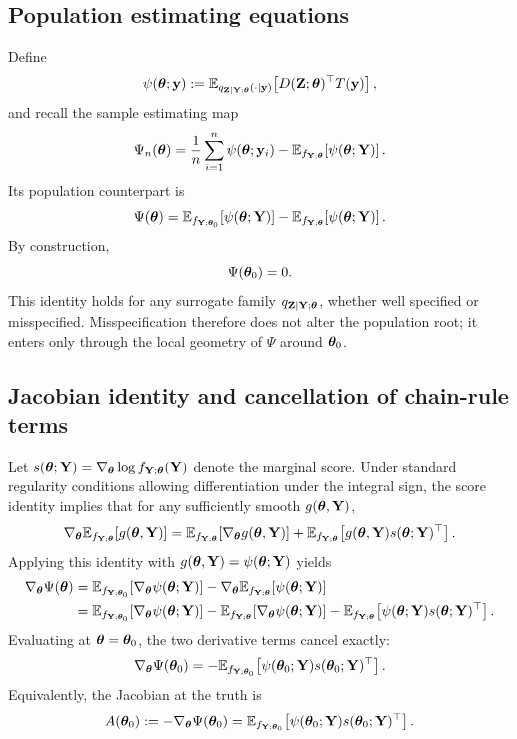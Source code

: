 \documentclass[twoside,11pt]{article}
\begin{document}
\subsection{Population estimating equations}

Define
\begin{equation}
\psi({\bm{\theta}};{\bf y})
:=
\mathbb E_{q_{{\bf Z}\mid{\bf Y};{\bm{\theta}}}(\cdot\mid {\bf y})}
\!\left[D({\bf Z};{\bm{\theta}})^\top T({\bf y})\right],
\label{eq:psi_theta_dep}
\end{equation}
and recall the sample estimating map
\[
\Psi_n({\bm{\theta}})
=
\frac{1}{n}\sum_{i=1}^n \psi({\bm{\theta}};{\bf y}_i)
-
\mathbb E_{f_{{\bf Y};{\bm{\theta}}}}\!\left[\psi({\bm{\theta}};{\bf Y})\right].
\]
Its population counterpart is
\[
\Psi({\bm{\theta}})
=
\mathbb E_{f_{{\bf Y};{\bm{\theta}}_0}}\!\left[\psi({\bm{\theta}};{\bf Y})\right]
-
\mathbb E_{f_{{\bf Y};{\bm{\theta}}}}\!\left[\psi({\bm{\theta}};{\bf Y})\right].
\]
By construction,
\[
\Psi({\bm{\theta}}_0)=0.
\]
This identity holds for any surrogate family $q_{{\bf Z}\mid{\bf Y};{\bm{\theta}}}$, whether
well specified or misspecified. Misspecification therefore does not alter the
population root; it enters only through the local geometry of $\Psi$ around
${\bm{\theta}}_0$.

\subsection{Jacobian identity and cancellation of chain-rule terms}

Let $s({\bm{\theta}};{\bf Y})=\nabla_{\bm{\theta}} \log f_{{\bf Y};{\bm{\theta}}}({\bf Y})$ denote the marginal score. Under
standard regularity conditions allowing differentiation under the integral sign,
the score identity implies that for any sufficiently smooth $g({\bm{\theta}},{\bf Y})$,
\[
\nabla_{\bm{\theta}} \mathbb E_{f_{{\bf Y};{\bm{\theta}}}}\!\left[g({\bm{\theta}},{\bf Y})\right]
=
\mathbb E_{f_{{\bf Y};{\bm{\theta}}}}\!\left[\nabla_{\bm{\theta}} g({\bm{\theta}},{\bf Y})\right]
+
\mathbb E_{f_{{\bf Y};{\bm{\theta}}}}\!\left[g({\bm{\theta}},{\bf Y})s({\bm{\theta}};{\bf Y})^\top\right].
\]
Applying this identity with $g({\bm{\theta}},{\bf Y})=\psi({\bm{\theta}};{\bf Y})$ yields
\begin{align}
\nabla_{\bm{\theta}} \Psi({\bm{\theta}})
&=
\mathbb E_{f_{{\bf Y};{\bm{\theta}}_0}}\!\left[\nabla_{\bm{\theta}} \psi({\bm{\theta}};{\bf Y})\right]
-
\nabla_{\bm{\theta}} \mathbb E_{f_{{\bf Y};{\bm{\theta}}}}\!\left[\psi({\bm{\theta}};{\bf Y})\right]
\nonumber\\
&=
\mathbb E_{f_{{\bf Y};{\bm{\theta}}_0}}\!\left[\nabla_{\bm{\theta}} \psi({\bm{\theta}};{\bf Y})\right]
-
\mathbb E_{f_{{\bf Y};{\bm{\theta}}}}\!\left[\nabla_{\bm{\theta}} \psi({\bm{\theta}};{\bf Y})\right]
-
\mathbb E_{f_{{\bf Y};{\bm{\theta}}}}\!\left[\psi({\bm{\theta}};{\bf Y})s({\bm{\theta}};{\bf Y})^\top\right].
\label{eq:jacobian_pre_cancel}
\end{align}
Evaluating at ${\bm{\theta}}={\bm{\theta}}_0$, the two derivative terms cancel exactly:
\begin{equation}
\nabla_{\bm{\theta}} \Psi({\bm{\theta}}_0)
=
-
\mathbb E_{f_{{\bf Y};{\bm{\theta}}_0}}\!\left[\psi({\bm{\theta}}_0;{\bf Y})s({\bm{\theta}}_0;{\bf Y})^\top\right].
\label{eq:jacobian_cancel}
\end{equation}
Equivalently, the Jacobian at the truth is
\begin{equation}
A({\bm{\theta}}_0)
:=
-\nabla_{\bm{\theta}} \Psi({\bm{\theta}}_0)
=
\mathbb E_{f_{{\bf Y};{\bm{\theta}}_0}}\!\left[\psi({\bm{\theta}}_0;{\bf Y})s({\bm{\theta}}_0;{\bf Y})^\top\right].
\label{eq:jacobian_final}
\end{equation}
\end{document}
